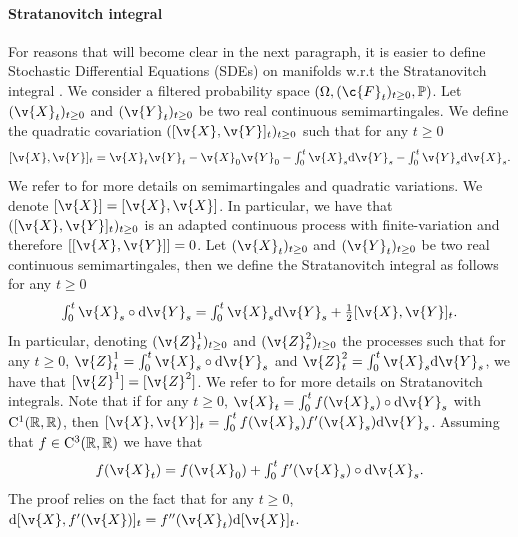\paragraph{Stratanovitch integral}
For reasons that will become clear in the next paragraph, it is easier to define Stochastic Differential Equations (SDEs) on manifolds w.r.t the Stratanovitch integral \cite[Part II, Chapter 3]{kloeden:platen:2011}.
We consider a filtered probability space $(\Omega, (\c{F}_t)_{t \geq 0}, \bb{P})$.
Let $(\v{X}_t)_{t \geq 0}$ and $(\v{Y}_t)_{t \geq 0}$ be two real continuous semimartingales.
We define the quadratic covariation $([\v{X},\v{Y}]_t)_{t \geq 0}$ such that for any $t \geq 0$ \begin{equation} \textstyle{[\v{X},\v{Y}]_t = \v{X}_t \v{Y}_t - \v{X}_0\v{Y}_0 - \int_0^t \v{X}_s \mathrm{d} \v{Y}_s - \int_0^t \v{Y}_s \mathrm{d} \v{X}_s .
	}
\end{equation}
We refer to \textcite[Chapter IV]{revuz1999continuous} for more details on semimartingales and quadratic variations.
We denote $[\v{X}] = [\v{X}, \v{X}]$.
In particular, we have that $([\v{X}, \v{Y}]_t)_{t \geq 0}$ is an adapted continuous process with finite-variation and therefore $[[\v{X}, \v{Y}]] = 0$.
Let $(\v{X}_t)_{t \geq 0}$ and $(\v{Y}_t)_{t \geq 0}$ be two real continuous semimartingales, then we define the Stratanovitch integral as follows for any $t \geq 0$ \begin{equation} \textstyle{ \int_0^t \v{X}_s \circ \mathrm{d} \v{Y}_s = \int_0^t \v{X}_s \mathrm{d} \v{Y}_s + \tfrac{1}{2} [\v{X}, \v{Y}]_t .
	}
\end{equation}
In particular, denoting $(\v{Z}_t^1)_{t \geq 0}$ and $(\v{Z}_t^2)_{t \geq 0}$ the processes such that for any $t \geq 0$, $\v{Z}_t^1 = \int_0^t \v{X}_s \circ \mathrm{d} \v{Y}_s$ and $\v{Z}_t^2 = \int_0^t \v{X}_s \mathrm{d} \v{Y}_s$, we have that $[\v{Z}^1] = [\v{Z}^2]$.
We refer to \textcite{kurtz1995stratonovich} for more details on Stratanovitch integrals.
Note that if for any $t \geq 0$, $\v{X}_t = \int_0^t f(\v{X}_s) \circ \mathrm{d} \v{Y}_s$ with $\mathrm{C}^1(\mathbb{R}, \mathbb{R})$, then $[\v{X}, \v{Y}]_t = \int_0^t f(\v{X}_s) f'(\v{X}_s) \mathrm{d} \v{Y}_s$.
Assuming that $f \in \mathrm{C}^3(\mathbb{R}, \mathbb{R})$ we have that \cite[Chapter IV, Exercise 3.15]{revuz1999continuous} \begin{equation} \label{eq:stratanovitch_lemma} \textstyle{ f(\v{X}_t) = f(\v{X}_0) + \int_0^t f'(\v{X}_s) \circ \mathrm{d} \v{X}_s .
	}
\end{equation}
The proof relies on the fact that for any $t \geq 0$, $\mathrm{d} [\v{X}, f'(\v{X})]_t = f''(\v{X}_t) \mathrm{d} [\v{X}]_t$.
